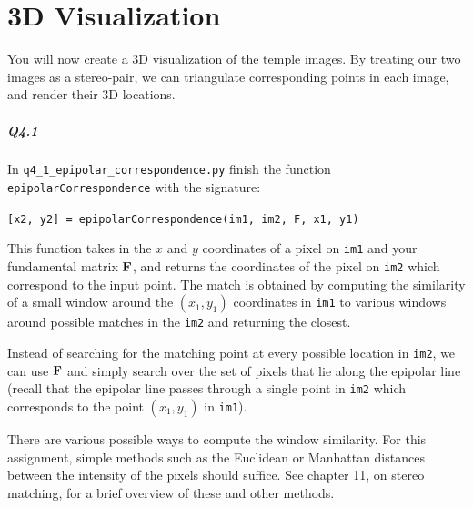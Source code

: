 
\section{3D Visualization}
\label{sec:viz}
You will now create a 3D visualization of the temple images. By treating our two images as a stereo-pair, we can triangulate corresponding points in each image, and render their 3D locations.

\subparagraph*{Q4.1} In \texttt{q4\_1\_epipolar\_correspondence.py} finish the function \\ \texttt{epipolarCorrespondence} with the signature:
\begin{center}
    \texttt{[x2, y2] = epipolarCorrespondence(im1, im2, F, x1, y1)}
\end{center}
This function takes in the $x$ and $y$ coordinates of a pixel on \verb!im1! and your fundamental matrix ${\bf F}$, and returns the coordinates of the pixel on \verb!im2! which correspond to the input point. The match is obtained by computing the similarity of a small window around the $(x_1, y_1)$ coordinates in \verb!im1! to various windows around possible matches in the \verb!im2! and returning the closest.

Instead of searching for the matching point at every possible location in \verb!im2!, we can use ${\bf F}$ and simply search over the set of pixels that lie along the epipolar line (recall that the epipolar line passes through a single point in \verb!im2!  which corresponds to the point $(x_1, y_1)$ in \verb!im1!).

There are various possible ways to compute the window similarity. For this assignment, simple methods such as the Euclidean or Manhattan distances between the intensity of the pixels should suffice.  See \cite{szeliski2022computer} chapter 11, on stereo matching, for a brief overview of these and other methods.

